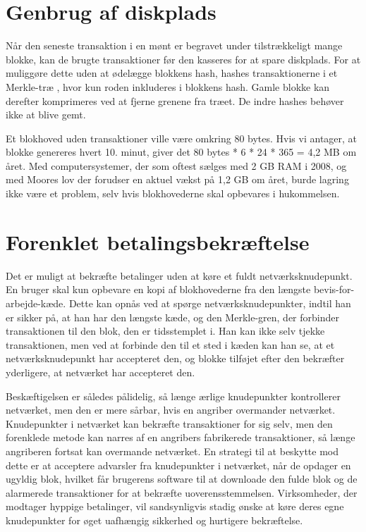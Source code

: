 \documentclass{article}
\begin{document}
\section{Genbrug af diskplads}\label{sec:reclaiming-disk-space}
Når den seneste transaktion i en mønt er begravet under tilstrækkeligt mange blokke, kan de brugte transaktioner før den kasseres for at spare diskplads. For at muliggøre
dette uden at ødelægge blokkens hash, hashes transaktionerne i et Merkle-træ \cite{merkle1980protocols, massias1999design, haber1997secure}, hvor kun roden inkluderes
i blokkens hash. Gamle blokke kan derefter komprimeres ved at fjerne grenene fra træet. De indre hashes behøver ikke at blive gemt.\\

\vspace{1em}

\vspace{1em}

Et blokhoved uden transaktioner ville være omkring 80 bytes. Hvis vi antager, at blokke genereres hvert 10. minut, giver det 80 bytes * 6 * 24 * 365 = 4,2 MB om året. Med
computersystemer, der som oftest sælges med 2 GB RAM i 2008, og med Moores lov der forudser en aktuel vækst på 1,2 GB om året, burde lagring ikke være et problem, selv hvis
blokhovederne skal opbevares i hukommelsen.

\section{Forenklet betalingsbekræftelse}\label{sec:simplified-payment-verification}
Det er muligt at bekræfte betalinger uden at køre et fuldt netværksknudepunkt. En bruger skal
kun opbevare en kopi af blokhovederne fra den længste bevis-for-arbejde-kæde. Dette kan opnås ved at spørge netværksknudepunkter, indtil han er sikker på, at han har den
længste kæde, og den Merkle-gren, der forbinder transaktionen til den blok, den er tidsstemplet i. Han kan ikke selv tjekke transaktionen, men ved at forbinde den til et sted
i kæden kan han se, at et netværksknudepunkt har accepteret den, og blokke tilføjet efter den bekræfter yderligere, at netværket har accepteret den. \\

\vspace{1em}

\vspace{1em}

Beskæftigelsen er således pålidelig, så længe ærlige knudepunkter kontrollerer netværket, men den er mere sårbar, hvis en angriber overmander netværket. Knudepunkter i netværket
kan bekræfte transaktioner for sig selv, men den forenklede metode kan narres af en angribers fabrikerede transaktioner, så længe angriberen fortsat kan overmande netværket.
En strategi til at beskytte mod dette er at acceptere advarsler fra knudepunkter i netværket, når de opdager en ugyldig blok, hvilket får brugerens software til at downloade
den fulde blok og de alarmerede transaktioner for at bekræfte uoverensstemmelsen. Virksomheder, der modtager hyppige betalinger, vil sandsynligvis stadig ønske at køre deres
egne knudepunkter for øget uafhængig sikkerhed og hurtigere bekræftelse.
\end{document}
